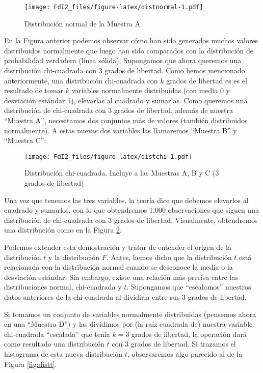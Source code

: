 \documentclass[spanish,]{book}
\begin{document}
\begin{figure}
\centering
\texttt{[image: FdI2\_files/figure-latex/distnormal-1.pdf]}
\caption{\label{fig:distnormal}Distribución normal de la Muestra A}
\end{figure}

En la Figura anterior podemos observar cómo han sido generados muchos
valores distribuidos normalmente que luego han sido comparados con la
distribución de probabilidad verdadera (línea sólida). Supongamos que
ahora queremos una distribución chi-cuadrada con 3 grados de libertad.
Como hemos mencionado anteriormente, una distribución chi-cuadrada con
\(k\) grados de libertad es es el resultado de tomar \(k\) variables
normalmente distribuidas (con media 0 y desviación estándar 1),
elevarlas al cuadrado y sumarlas. Como queremos una distribución de
chi-cuadrada con 3 grados de libertad, además de nuestra ``Muestra A'',
necesitamos dos conjuntos más de valores (también distribuidos
normalmente). A estas nuevas dos variables las llamaremos ``Muestra B''
y ``Muestra C'':

\begin{figure}
\centering
\texttt{[image: FdI2\_files/figure-latex/distchi-1.pdf]}
\caption{\label{fig:distchi}Distribución chi-cuadrada. Incluye a las
Muestras A, B y C (3 grados de libertad)}
\end{figure}

Una vez que tenemos las tres variables, la teoría dice que debemos
elevarlos al cuadrado y sumarlos, con lo que obtendremos 1,000
observaciones que siguen una distribución de chi-cuadrada con 3 grados
de libertad. Visualmente, obtendremos una distribución como en la Figura
\ref{fig:distchi}.

Podemos extender esta demostración y tratar de entender el origen de la
distribución \(t\) y la distribución \(F\). Antes, hemos dicho que la
distribución \(t\) está relacionada con la distribución normal cuando se
desconoce la media o la desviación estándar. Sin embargo, existe una
relación más precisa entre las distribuciones normal, chi-cuadrada y
\(t\). Supongamos que ``escalamos'' nuestros datos anteriores de la
chi-cuadrada al dividirla entre sus 3 grados de libertad.

Si tomamos un conjunto de variables normalmente distribuidas (pensemos
ahora en una ``Muestra D'') y las dividimos por (la raíz cuadrada de)
nuestra variable chi-cuadrada ``escalada'' que tenía \(k=3\) grados de
libertad, la operación dará como resultado una distribución \(t\) con 3
grados de libertad. Si trazamos el histograma de esta nueva distribución
\(t\), observaremos algo parecido al de la Figura \ref{fig:distt}.
\end{document}
